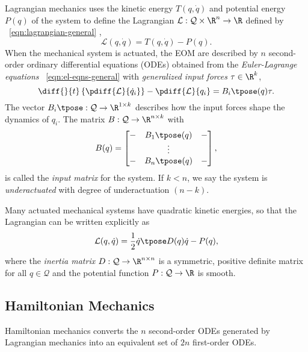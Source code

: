Lagrangian mechanics uses the kinetic energy \(T(q,\dot{q})\) and potential
energy \(P(q)\) of the system to define the Lagrangian 
\(\mathcal{L} : \mathcal{Q}\times\R^n \rightarrow \R\) defined by
~\eqref{eqn:lagrangian-general} \cite{greenwood_dynamics},
\begin{equation}\label{eqn:lagrangian-general}
    \mathcal{L}(q,\dot{q}) = T(q,\dot{q}) - P(q)
    .
\end{equation}
When the mechanical system is actuated, the EOM are described by \(n\) second-order
ordinary differential equations (ODEs) obtained from the \textit{Euler-Lagrange
equations} ~\eqref{eqn:el-eqns-general} with \textit{generalized input forces} 
\(\tau \in \R^k\),
\begin{equation}\label{eqn:el-eqns-general}
    \diff{}{t}\left\{ \pdiff{\mathcal{L}}{\dot{q}_i} \right\}
    - \pdiff{\mathcal{L}}{q_i} = B_i\tpose(q) \tau
    .
\end{equation}
The vector \(B_i\tpose: \mathcal{Q} \rightarrow \R^{1\times k}\) describes how
the input forces shape the dynamics of \(q_i\).
The matrix  \(B: \mathcal{Q} \rightarrow \R^{n \times k}\) with
\[
    B(q) = \begin{bmatrix}
        - & B_1\tpose(q) & - \\
          & \vdots & \\
        - & B_n\tpose(q) & - \\
    \end{bmatrix}
    ,
\]
is called the \textit{input matrix} for the system.
If \(k < n\), we say the system is \textit{underactuated} with degree of
underactuation \((n - k)\).

Many actuated mechanical systems have quadratic kinetic energies, so that the
Lagrangian can be written explicitly as
\begin{equation}\label{eqn:lagrangian}
    \mathcal{L}(q,\dot{q}) = \frac{1}{2} \dot{q}\tpose D(q) \dot{q} - P(q)
    ,
\end{equation}
where the \textit{inertia matrix} \(D: \mathcal{Q} \rightarrow \R^{n\times n}\) 
is a symmetric, positive definite matrix for all \(q \in \mathcal{Q}\) and the
potential function \(P : \mathcal{Q} \rightarrow \R\) is smooth. 

\subsection{Hamiltonian Mechanics}
Hamiltonian mechanics converts the \(n\) second-order ODEs generated by
Lagrangian mechanics into an equivalent set of \(2n\) first-order ODEs.

